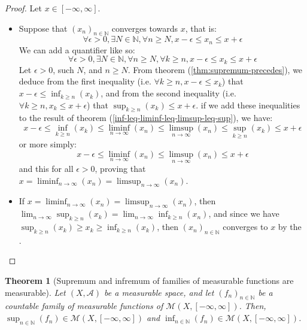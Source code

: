 \documentclass{article}
\newtheorem{theorem}{Theorem}[section]
\theoremstyle{definition}
\theoremstyle{remark}
\theoremstyle{example}
\theoremstyle{notation}
\theoremstyle{axiom}
\begin{document}
\begin{proof}
		Let $x \in [-\infty, \infty]$.
		\begin{itemize}
				\item Suppose that $(x_n)_{n \in \mathbb{N}}$ converges towards $x$, that is:
						$$\forall \epsilon > 0, \exists N \in \mathbb{N}, \forall n \geq N, x - \epsilon \leq x_n \leq x + \epsilon$$
				We can add a quantifier like so:
						$$\forall \epsilon > 0, \exists N \in \mathbb{N}, \forall n \geq N, \forall k \geq n, x - \epsilon \leq x_k \leq x + \epsilon$$
						Let $\epsilon > 0$, such $N$, and $n \geq N$. From theorem (\ref{thm:supremum-precedes}), we deduce from the first inequality (i.e. $\forall k \geq n, x - \epsilon \leq x_k$) that $x - \epsilon \leq \inf_{k \geq n}(x_k)$, and from the second inequality (i.e. $\forall k \geq n, x_k \leq x + \epsilon$) that $\sup_{k \geq n}(x_k) \leq x + \epsilon$. if we add these inequalities to the result of theorem (\ref{inf-leq-liminf-leq-limsup-leq-sup}), we have:
						$$x - \epsilon \leq \inf_{k \geq n}(x_k) \leq \liminf_{n \rightarrow \infty}(x_n) \leq \limsup_{n \rightarrow \infty}(x_n) \leq \sup_{k \geq n}(x_k) \leq x + \epsilon$$
				or more simply:
						$$x - \epsilon \leq \liminf_{n \rightarrow \infty}(x_n) \leq \limsup_{n \rightarrow \infty}(x_n) \leq x + \epsilon$$
				and this for all $\epsilon > 0$, proving that $x = \liminf_{n \rightarrow \infty}(x_n) = \limsup_{n \rightarrow \infty}(x_n)$.
				\item If $x = \liminf_{n \rightarrow \infty}(x_n) = \limsup_{n \rightarrow \infty}(x_n)$, then $\lim_{n \rightarrow \infty}\sup_{k \geq n}(x_k) = \lim_{n \rightarrow \infty}\inf_{k \geq n}(x_n)$, and since we have $\sup_{k \geq n}(x_k) \geq x_k \geq \inf_{k \geq n}(x_k)$, then $(x_n)_{n \in \mathbb{N}}$ converges to $x$ by the .
		\end{itemize}
\end{proof}

\begin{theorem}[Supremum and infremum of families of measurable functions are measurable] \label{thm:sup-inf-measurable}%
		Let $(X, \mathcal{A})$ be a measurable space, and let $(f_n)_{n \in \mathbb{N}}$ be a countable family of measurable functions of $\mathcal{M}(X, [-\infty, \infty])$. Then, $\sup_{n \in \mathbb{N}}(f_n) \in \mathcal{M}(X, [-\infty, \infty])$ and $\inf_{n \in \mathbb{N}}(f_n) \in \mathcal{M}(X, [-\infty, \infty])$.
\end{theorem}
\end{document}
